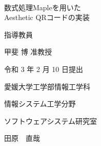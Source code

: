\pagestyle{empty}
\setlength{\oddsidemargin}{-2.0cm}
\setlength{\textwidth}{20cm}

\
\vspace{3cm}

\begin{center}
{\LARGE {数式処理Mapleを用いた\\Aesthetic QRコードの実装}}\\

\vspace{9mm}

{\Large 指導教員}

\vspace{5mm}

{\Large 甲斐 博 准教授}\\

\vspace{6cm}

{\Large 令和 3 年 2 月 10 日提出}\\

\vspace{20mm}

{\Large 愛媛大学工学部情報工学科}\\

\vspace{4mm}

{\Large 情報システム工学分野}\\

\vspace{4mm}

{\Large ソフトウェアシステム研究室}\\

\vspace{18mm}

{\huge 田原　直哉}\\

\end{center}


